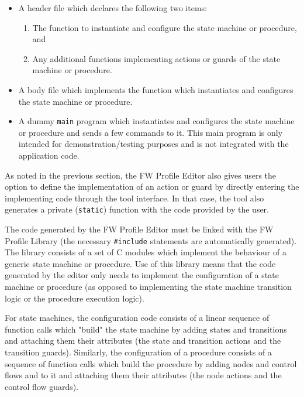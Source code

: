 \documentclass{pnp_article}
\begin{document}
\begin{itemize}
\item A header file which declares the following two items: 
\begin{enumerate}
\item The function to instantiate and configure the state machine or procedure, and
\item Any additional functions implementing actions or guards of the state machine or procedure. 
\end{enumerate}
\item A body file which implements the function which instantiates and configures the state machine or procedure.
\item A dummy \texttt{main} program which instantiates and configures the state machine or procedure and sends a few commands to it. This main program is only intended for demonstration/testing purposes and is not integrated with the application code. 
\end{itemize}

As noted in the previous section, the FW Profile Editor also gives users the option to define the implementation of an action or guard by directly entering the implementing code through the tool interface. In that case, the tool also generates a private (\texttt{static}) function with the code provided by the user. 

The code generated by the FW Profile Editor must be linked with the FW Profile Library (the necessary \texttt{\#include} statements are automatically generated). The library consists of a set of C modules which implement the behaviour of a generic state machine or procedure. Use of this library means that the code generated by the editor only needs to implement the configuration of a state machine or procedure (as opposed to implementing the state machine transition logic or the procedure execution logic). 

For state machines, the configuration code consists of a linear sequence of function calls which "build" the state machine by adding states and transitions and attaching them their attributes (the state and transition actions and the transition guards). Similarly, the configuration of a procedure consists of a sequence of function calls which build the procedure by adding nodes and control flows and to it and attaching them their attributes (the node actions and the control flow guards). 

\end{document}
